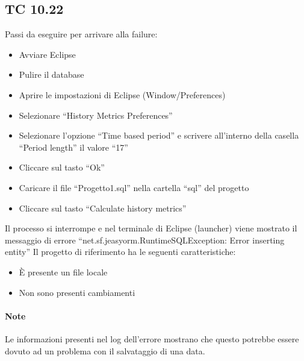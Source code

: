 \subsection*{TC 10.22}
Passi da eseguire per arrivare alla failure:
\begin{itemize}
 \item Avviare Eclipse
 \item Pulire il database
 \item Aprire le impostazioni di Eclipse (Window/Preferences)
 \item Selezionare ``History Metrics Preferences''
 \item Selezionare l'opzione ``Time based period'' e scrivere all'interno della casella ``Period length'' il valore ``17''
 \item Cliccare sul tasto ``Ok''
 \item Caricare il file ``Progetto1.sql'' nella cartella ``sql'' del progetto
 \item Cliccare sul tasto ``Calculate history metrics''
\end{itemize}
Il processo si interrompe e nel terminale di Eclipse (launcher) viene mostrato il messaggio di errore ``net.sf.jeasyorm.RuntimeSQLException: Error inserting entity''
\newline
Il progetto di riferimento ha le seguenti caratteristiche:
\begin{itemize}
 \item È presente un file locale
 \item Non sono presenti cambiamenti
\end{itemize}

\paragraph{Note} Le informazioni presenti nel log dell'errore mostrano che questo potrebbe essere dovuto ad un problema con il salvataggio di una data.





\newpage





